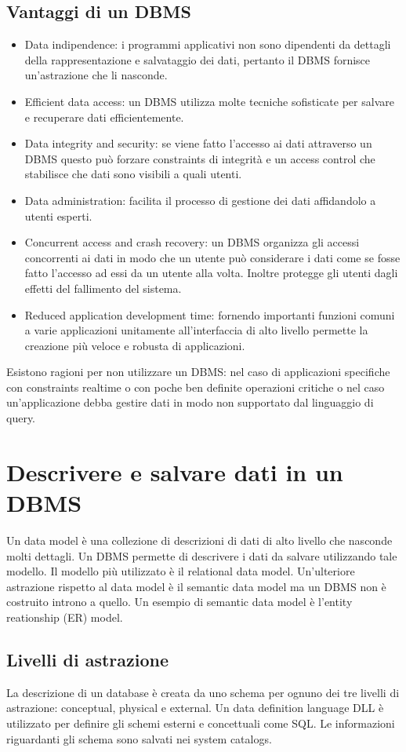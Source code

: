 \subsection{Vantaggi di un DBMS}
\begin{itemize}
\item Data indipendence: i programmi applicativi non sono dipendenti da dettagli della rappresentazione e salvataggio dei dati, pertanto il DBMS fornisce un'astrazione che li nasconde.
\item Efficient data access: un DBMS utilizza molte tecniche sofisticate per salvare e recuperare dati efficientemente.
\item Data integrity and security: se viene fatto l'accesso ai dati attraverso un DBMS questo pu\`o forzare constraints di integrit\`a e un access control che stabilisce che dati sono visibili a quali utenti.
\item Data administration: facilita il processo di gestione dei dati affidandolo a utenti esperti.
\item Concurrent access and crash recovery: un DBMS organizza gli accessi concorrenti ai dati in modo che un utente pu\`o considerare i dati come se fosse fatto l'accesso ad essi da un utente alla volta. Inoltre 
protegge gli utenti dagli effetti del fallimento del sistema.
\item Reduced application development time: fornendo importanti funzioni comuni a varie applicazioni unitamente all'interfaccia di alto livello permette la creazione pi\`u veloce e robusta di applicazioni.
\end{itemize}
Esistono ragioni per non utilizzare un DBMS: nel caso di applicazioni specifiche con constraints realtime o con poche ben definite operazioni critiche o nel caso un'applicazione debba gestire dati in modo non 
supportato dal linguaggio di query. 
\section{Descrivere e salvare dati in un DBMS}
Un data model \`e una collezione di descrizioni di dati di alto livello che nasconde molti dettagli. Un DBMS permette di descrivere i dati da salvare utilizzando tale modello. Il modello pi\`u utilizzato \`e il 
relational data model. Un'ulteriore astrazione rispetto al data model \`e il semantic data model ma un DBMS non \`e costruito introno a quello. Un esempio di semantic data model \`e l'entity reationship (ER) 
model. 
\subsection{Livelli di astrazione}
La descrizione di un database \`e creata da uno schema per ognuno dei tre livelli di astrazione: conceptual, physical e external. Un data definition language DLL \`e utilizzato per definire gli schemi esterni e 
concettuali come SQL. Le informazioni riguardanti gli schema sono salvati nei system catalogs.
